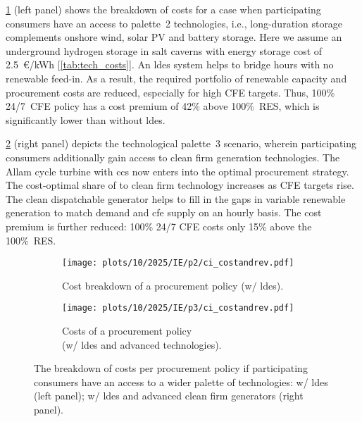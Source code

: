 \documentclass[11pt, 5p, nopreprintline]{elsarticle}
\begin{document}
\cref{fig:10-2025-IE-p2-ci_costandrev} (left panel) shows the breakdown of costs for a case when participating consumers have an access to palette~2 technologies, i.e., long-duration storage complements onshore wind, solar PV and battery storage.
Here we assume an underground hydrogen storage in salt caverns with energy storage cost of 2.5~\euro/kWh [\cref{tab:tech_costs}].
An \gls{ldes} system helps to bridge hours with no renewable feed-in.
As a result, the required portfolio of renewable capacity and procurement costs are reduced, especially for high CFE targets.
Thus, 100\% 24/7~CFE policy has a cost premium of 42\% above 100\%~RES, which is significantly lower than without \gls{ldes}.

\cref{fig:10-2025-IE-p3-ci_costandrev} (right panel) depicts the technological palette~3 scenario, wherein participating consumers additionally gain access to clean firm generation technologies.
The Allam cycle turbine with \gls{ccs} now enters into the optimal procurement strategy.
The cost-optimal share of to clean firm technology increases as CFE targets rise.
The clean dispatchable generator helps to fill in the gaps in variable renewable generation to match demand and \gls{cfe} supply on an hourly basis.
The cost premium is further reduced: 100\% 24/7 CFE costs only 15\% above the 100\%~RES.

\begin{figure*}
    \centering
    \begin{subfigure}{0.5\textwidth}
        \centering
        \caption{Cost breakdown of a procurement policy (w/ \gls{ldes}).}
        \texttt{[image: plots/10/2025/IE/p2/ci\_costandrev.pdf]}
        \label{fig:10-2025-IE-p2-ci_costandrev}
    \end{subfigure}%
    \begin{subfigure}{0.5\textwidth}
        \centering
        \caption{Costs of a procurement policy \\
        (w/ \gls{ldes} and advanced technologies).}
        \texttt{[image: plots/10/2025/IE/p3/ci\_costandrev.pdf]}
        \label{fig:10-2025-IE-p3-ci_costandrev}
    \end{subfigure}
    \caption{The breakdown of costs per procurement policy if participating consumers have an access to a wider palette of technologies: w/ \gls{ldes} (left panel); w/ \gls{ldes} and advanced clean firm generators (right panel).
    }
    \label{fig:10-2025-IE-p23-ci_procurement}
\end{figure*}
\end{document}

